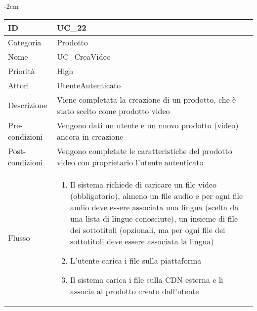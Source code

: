 \begin{center}
\begin{table}[bp]
    \centering
    \addtolength{\leftskip} {-2cm}
\begin{tabular}{ |p{2.6cm}|p{13cm}|  }
\hline
ID & UC\_22\\\hline
Categoria & Prodotto \\\hline
Nome & UC\_CreaVideo \\\hline
Priorità & High \\\hline
Attori &  UtenteAutenticato \\\hline
Descrizione & Viene completata la creazione di un prodotto, che è stato scelto come prodotto video\\\hline
Pre-condizioni &   Vengono dati un utente e un nuovo prodotto (video) ancora in creazione\\\hline
Post-condizioni &  Vengono completate le caratteristiche del prodotto video con proprietario l'utente autenticato\\\hline
Flusso &  	\begin{enumerate}
			\item Il sistema richiede di caricare un file video (obbligatorio), almeno un file audio e per ogni file audio deve essere associata una lingua (scelta da una lista di lingue conosciute), un insieme di file dei sottotitoli (opzionali, ma per ogni file dei sottotitoli deve essere associata la lingua)
			\item L'utente carica i file sulla piattaforma
			\item Il sistema carica i file sulla CDN esterna e li associa al prodotto creato dall'utente
		\end{enumerate}\\\hline
\end{tabular}
\label{table_use_case:22}\newline
\end{table}


\end{center}
